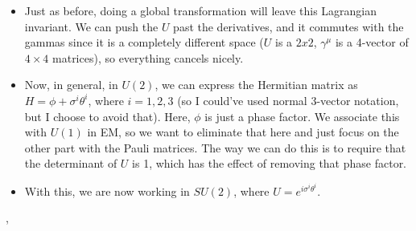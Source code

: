 \begin{itemize}
    \item Just as before, doing a global transformation will leave this Lagrangian invariant. We can push the $U$ past the derivatives, and it commutes with the gammas since it is a completely different space ($U$ is a $2x2$, $\gamma^{\mu}$ is a 4-vector of $4\times4$ matrices), so everything cancels nicely.
    \item Now, in general, in $U(2)$, we can express the Hermitian matrix as $H = \phi + \sigma^i\theta^i$, where $i=1,2,3$ (so I could've used normal 3-vector notation, but I choose to avoid that). Here, $\phi$ is just a phase factor. We associate this with $U(1)$ in EM, so we want to eliminate that here and just focus on the other part with the Pauli matrices. The way we can do this is to require that the determinant of $U$ is 1, which has the effect of removing that phase factor.
    \item With this, we are now working in $SU(2)$, where $U = e^{i\sigma^i\theta^i}$.
\end{itemize}

\sep

